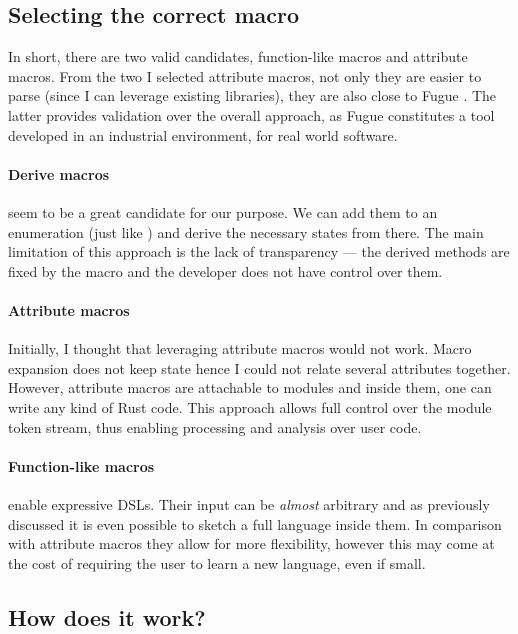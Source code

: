 \subsection{Selecting the correct macro}

In short, there are two valid candidates, function-like macros and attribute macros.
From the two I selected attribute macros,
not only they are easier to parse (since I can leverage existing libraries),
they are also close to Fugue \autocite{DeLine2004}.
The latter provides validation over the overall approach, as Fugue constitutes a tool developed in an industrial environment, for real world software.

\paragraph{Derive macros} seem to be a great candidate for our purpose.
We can add them to an enumeration (just like \autocite{Fitzgerald2019}) and derive the necessary states from there.
The main limitation of this approach is the lack of transparency —
the derived methods are fixed by the macro and the developer does not have control over them.

\paragraph{Attribute macros} Initially, I thought that leveraging attribute macros would not work.
Macro expansion does not keep state hence I could not relate several attributes together.
However, attribute macros are attachable to modules and inside them, one can write any kind of Rust code.
This approach allows full control over the module token stream, thus enabling processing and analysis over user code.

\paragraph{Function-like macros} enable expressive DSLs.
Their input can be \emph{almost} arbitrary and as previously discussed it is even possible to sketch a full language inside them.
In comparison with attribute macros they allow for more flexibility, however this may come at the cost of requiring the user to learn a new language, even if small.


\subsection{How does it work?}

